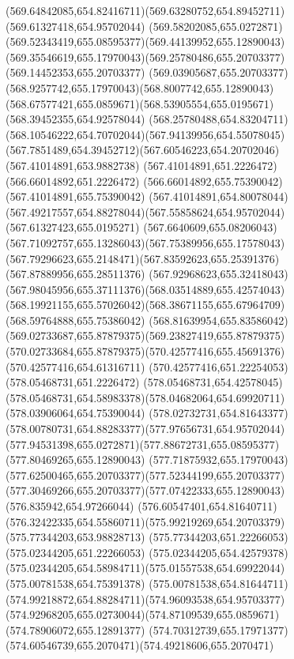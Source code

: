 {{	\curveto(569.64842085,654.82416711)(569.63280752,654.89452711)(569.61327418,654.95702044)
	\curveto(569.58202085,655.0272871)(569.52343419,655.08595377)(569.44139952,655.12890043)
	\curveto(569.35546619,655.17970043)(569.25780486,655.20703377)(569.14452353,655.20703377)
	\curveto(569.03905687,655.20703377)(568.9257742,655.17970043)(568.8007742,655.12890043)
	\curveto(568.67577421,655.0859671)(568.53905554,655.0195671)(568.39452355,654.92578044)
	\curveto(568.25780488,654.83204711)(568.10546222,654.70702044)(567.94139956,654.55078045)
	\curveto(567.7851489,654.39452712)(567.60546223,654.20702046)(567.41014891,653.9882738)
	\lineto(567.41014891,651.2226472)
	\lineto(566.66014892,651.2226472)
	\lineto(566.66014892,655.75390042)
	\lineto(567.41014891,655.75390042)
	\lineto(567.41014891,654.80078044)
	\curveto(567.49217557,654.88278044)(567.55858624,654.95702044)(567.61327423,655.0195271)
	\curveto(567.6640609,655.08206043)(567.71092757,655.13286043)(567.75389956,655.17578043)
	\curveto(567.79296623,655.2148471)(567.83592623,655.25391376)(567.87889956,655.28511376)
	\curveto(567.92968623,655.32418043)(567.98045956,655.37111376)(568.03514889,655.42574043)
	\curveto(568.19921155,655.57026042)(568.38671155,655.67964709)(568.59764888,655.75386042)
	\curveto(568.81639954,655.83586042)(569.02733687,655.87879375)(569.23827419,655.87879375)
	\curveto(570.02733684,655.87879375)(570.42577416,655.45691376)(570.42577416,654.61316711)
	\lineto(570.42577416,651.22254053)
	\closepath
	\moveto(578.05468731,651.2226472)
	\lineto(578.05468731,654.42578045)
	\curveto(578.05468731,654.58983378)(578.04682064,654.69920711)(578.03906064,654.75390044)
	\curveto(578.02732731,654.81643377)(578.00780731,654.88283377)(577.97656731,654.95702044)
	\curveto(577.94531398,655.0272871)(577.88672731,655.08595377)(577.80469265,655.12890043)
	\curveto(577.71875932,655.17970043)(577.62500465,655.20703377)(577.52344199,655.20703377)
	\curveto(577.30469266,655.20703377)(577.07422333,655.12890043)(576.835942,654.97266044)
	\curveto(576.60547401,654.81640711)(576.32422335,654.55860711)(575.99219269,654.20703379)
	\lineto(575.77344203,653.98828713)
	\lineto(575.77344203,651.22266053)
	\lineto(575.02344205,651.22266053)
	\lineto(575.02344205,654.42579378)
	\curveto(575.02344205,654.58984711)(575.01557538,654.69922044)(575.00781538,654.75391378)
	\curveto(575.00781538,654.81644711)(574.99218872,654.88284711)(574.96093538,654.95703377)
	\curveto(574.92968205,655.02730044)(574.87109539,655.0859671)(574.78906072,655.12891377)
	\curveto(574.70312739,655.17971377)(574.60546739,655.2070471)(574.49218606,655.2070471)
}}
